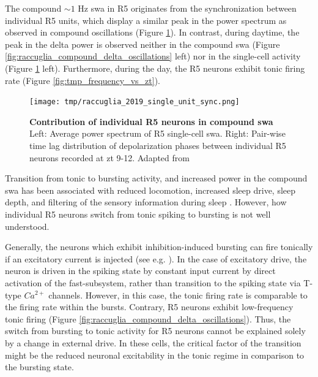 \documentclass[../main.tex]{subfiles}
\begin{document}
The compound $\sim 1$ Hz \gls{swa} in R5 originates from the synchronization between individual R5 units, which display a similar peak in the power spectrum as observed in compound oscillations \parencite{raccugliaNetworkSpecificSynchronizationElectrical2019} (Figure \ref{fig:tmp_single_unit_r5_day_night}).
In contrast, during daytime, the peak in the delta power is observed neither in the compound \gls{swa} (Figure \ref{fig:raccuglia_compound_delta_oscillations} left) nor in the single-cell activity (Figure \ref{fig:tmp_single_unit_r5_day_night} left).
Furthermore, during the day, the R5 neurons exhibit tonic firing rate (Figure \ref{fig:tmp_frequency_vs_zt}).

\begin{figure}[!t]
    \centering
    \texttt{[image: tmp/raccuglia\_2019\_single\_unit\_sync.png]}
    \caption[Contribution of individual R5 neurons in compound \gls{swa}]{
        \textbf{Contribution of individual R5 neurons in compound \gls{swa}}
        Left: Average power spectrum of R5 single-cell \gls{swa}.
        Right: Pair-wise time lag distribution of depolarization phases between individual R5 neurons recorded at \gls{zt} 9-12.
        Adapted from \parencite{raccugliaNetworkSpecificSynchronizationElectrical2019}
    }
    \label{fig:tmp_single_unit_r5_day_night}
\end{figure}

Transition from tonic to bursting activity, and increased power in the compound \gls{swa} has been associated with reduced locomotion, increased sleep drive, sleep depth, and filtering of the sensory information during sleep
\parencite{liuSleepDriveEncoded2016,raccugliaNetworkSpecificSynchronizationElectrical2019,
raccugliaCoherentMultilevelNetwork2022,suarez-grimaltNeuralArchitectureSleep2021}.
However, how individual R5 neurons switch from tonic spiking to bursting is not well understood.

Generally, the neurons which exhibit inhibition-induced bursting can fire tonically if an excitatory current is injected (see e.g. \parencite{wangMultipleDynamicalModes1994}).
In the case of excitatory drive, the neuron is driven in the spiking state by constant input current by direct activation of the fast-subsystem, rather than transition to the spiking state via T-type $Ca^{2+}$ channels. However, in this case, the tonic firing rate is comparable to the firing rate within the bursts. Contrary, R5 neurons exhibit low-frequency tonic firing \parencite{raccugliaNetworkSpecificSynchronizationElectrical2019} (Figure \ref{fig:raccuglia_compound_delta_oscillations}).
Thus, the switch from bursting to tonic activity for R5 neurons cannot be explained solely by a change in external drive. In these cells, the critical factor of the transition might be the reduced neuronal excitability in the tonic regime in comparison to the bursting state.
\end{document}
